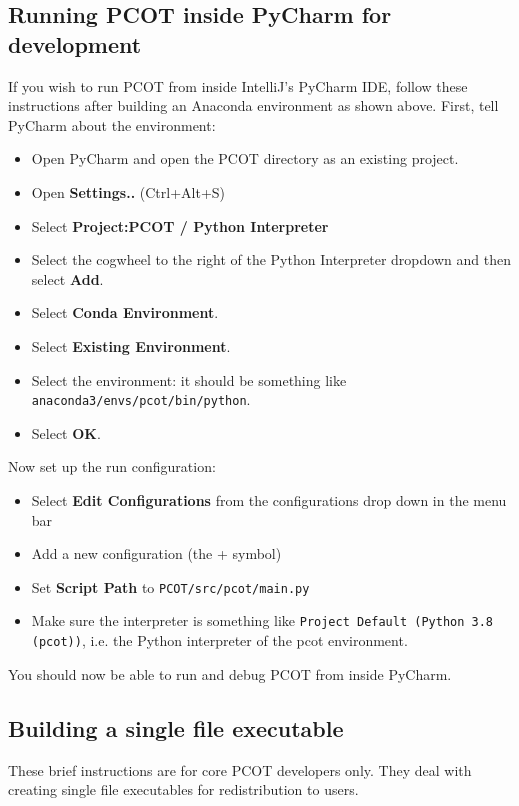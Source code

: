 \subsection{Running PCOT inside PyCharm for development}
If you wish to run PCOT from inside IntelliJ's PyCharm IDE, follow these instructions after building an Anaconda environment as shown
above. First, tell PyCharm about the environment:
\begin{itemize}
\item Open PyCharm and open the PCOT directory as an existing project.
\item Open \textbf{Settings..} (Ctrl+Alt+S)
\item Select \textbf{Project:PCOT / Python Interpreter}
\item Select the cogwheel to the right of the Python Interpreter dropdown and then select \textbf{Add}.
\item Select \textbf{Conda Environment}.
\item Select \textbf{Existing Environment}.
\item Select the environment: it should be something like \texttt{anaconda3/envs/pcot/bin/python}.
\item Select \textbf{OK}.
\end{itemize}
Now set up the run configuration:
\begin{itemize}
\item Select \textbf{Edit Configurations} from the configurations drop down in the menu bar
\item Add a new configuration (the + symbol)
\item Set \textbf{Script Path} to \texttt{PCOT/src/pcot/main.py}
\item Make sure the interpreter is something like \texttt{Project Default (Python 3.8 (pcot))},
i.e. the Python interpreter of the pcot environment.
\end{itemize}
You should now be able to run and debug PCOT from inside PyCharm.

\subsection{Building a single file executable}
These brief instructions are for core PCOT developers only. They deal with creating single file executables for redistribution to users.


